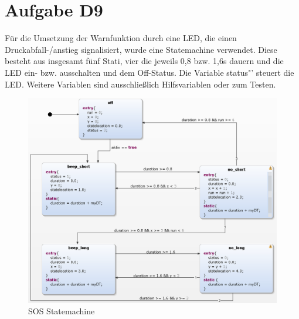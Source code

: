 
\chapter{Aufgabe D9}
Für die Umsetzung der Warnfunktion durch eine LED, die einen Druckabfall-/anstieg signalisiert, wurde eine Statemachine verwendet. Diese besteht aus insgesamt fünf Stati, vier die jeweils 0,8 bzw. 1,6s dauern und die LED ein- bzw. ausschalten und dem Off-Status.
Die Variable \glqq status"' steuert die LED. Weitere Variablen sind ausschließlich Hilfsvariablen oder zum Testen.

\begin{figure}[h!]
	\centering
	\includegraphics[width=1\linewidth]{../Graphiken/SOS_state.png}
	\caption{SOS Statemachine}
	\label{fig:SOS_state}
\end{figure}